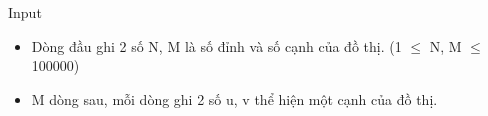 Input
\begin{itemize}
	\item     Dòng đầu ghi 2 số N, M là số đỉnh và số cạnh của đồ thị. (1  $\le$  N, M  $\le$  100000)   
\end{itemize}
\begin{itemize}
	\item     M dòng sau, mỗi dòng ghi 2 số u, v thể hiện một cạnh của đồ thị.   
\end{itemize}